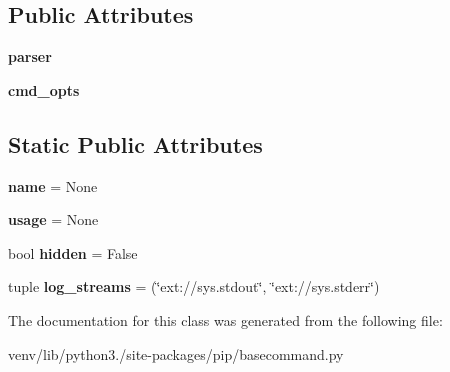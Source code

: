 \subsection*{Public Attributes}
\begin{DoxyCompactItemize}
\item 
\mbox{\label{classpip_1_1basecommand_1_1_command_aa54711ee57d94aa0fb65cc530c008c12}} 
{\bfseries parser}
\item 
\mbox{\label{classpip_1_1basecommand_1_1_command_a4223fa882cacc499d5276f501e3b20e9}} 
{\bfseries cmd\+\_\+opts}
\end{DoxyCompactItemize}
\subsection*{Static Public Attributes}
\begin{DoxyCompactItemize}
\item 
\mbox{\label{classpip_1_1basecommand_1_1_command_a1963e9b2098d77351069ec0ef4c21359}} 
{\bfseries name} = None
\item 
\mbox{\label{classpip_1_1basecommand_1_1_command_af591f45cf3bf5893da2a253071872ad7}} 
{\bfseries usage} = None
\item 
\mbox{\label{classpip_1_1basecommand_1_1_command_a9e9e95c8f79a09b56336f55452991aa6}} 
bool {\bfseries hidden} = False
\item 
\mbox{\label{classpip_1_1basecommand_1_1_command_a4013c935e1e7c5f82b1f3aa223f71565}} 
tuple {\bfseries log\+\_\+streams} = (\char`\"{}ext\+://sys.\+stdout\char`\"{}, \char`\"{}ext\+://sys.\+stderr\char`\"{})
\end{DoxyCompactItemize}


The documentation for this class was generated from the following file\+:\begin{DoxyCompactItemize}
\item 
venv/lib/python3./site-\/packages/pip/basecommand.\+py\end{DoxyCompactItemize}
